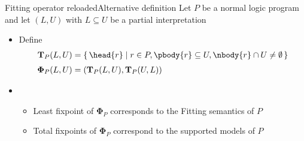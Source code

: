 \begin{frame}{Fitting operator reloaded}{Alternative definition}
  Let $P$ be a normal logic program\\
  and let $(L,U)$ with $L\subseteq U$ be a partial interpretation
  \medskip
  \begin{itemize}
  \item <2-> Define
    \begin{align*}
      {\mathbf{T}}_P(L,U)
      & =
      \{\, \head{r} \mid r \in P, \pbody{r} \subseteq U, \nbody{r} \cap U\neq \emptyset \,\}
      \\[3pt]
      {\mathbf{\Phi}}_P(L,U)
      & =
      ({\mathbf{T}}_P(L,U),{\mathbf{T}}_P(U,L))
    \end{align*}
  \item <3-> 
    \begin{itemize}\normalsize
    \item Least fixpoint  of ${\mathbf{\Phi}}_P$ corresponds to the Fitting semantics of $P$
      \smallskip
    \item Total fixpoints of ${\mathbf{\Phi}}_P$ correspond  to the supported models of $P$
    \end{itemize}
  \end{itemize}
  \nocite{truszczynski18a}
\end{frame}
%
